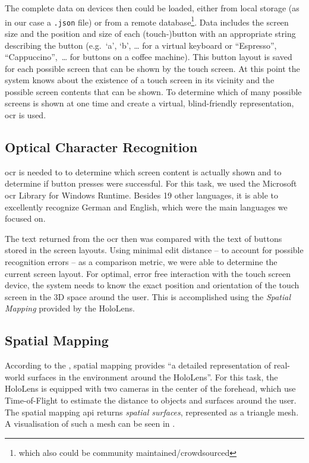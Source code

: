 The complete data on devices then could be loaded, either from local storage (as in  our case a \texttt{.json} file) or from a remote database\footnote{which also could be community maintained/crowdsourced}.
Data includes the screen size and the position and size of each (touch-)button with an appropriate string describing the button (e.g.\ \enquote*{a}, \enquote*{b}, \dots{} for a virtual keyboard or \enquote{Espresso}, \enquote{Cappuccino},~\dots{} for buttons on a coffee machine).
This button layout is saved for each possible screen that can be shown by the touch screen.
At this point  the system knows about the existence of a touch screen in its vicinity and the possible screen contents that can be shown.
To determine which of many possible screens is shown at one time and create a virtual, blind-friendly representation, \ac{ocr} is used.

\subsection{Optical Character Recognition}
\label{subsec:ocr}
\ac{ocr} is needed to  to determine which screen content is actually shown and to determine if button presses were successful.
For this task, we used the Microsoft \ac{ocr} Library for Windows Runtime.
Besides 19 other languages, it is able to excellently recognize German and English, which were the main languages we focused on.

The text returned from the \ac{ocr} then was compared with the text of buttons stored in the screen layouts. 
Using minimal edit distance  -- to account for possible recognition errors -- as a comparison metric, we were able to determine the current screen layout.
For optimal, error free interaction with the touch screen device, the system needs to know the exact position and orientation of the touch screen in the 3D space around the user.
This is accomplished using the \emph{Spatial Mapping} provided by the HoloLens.

\subsection{Spatial Mapping}
\label{subsec:spatial}
According to the \textcite{spatialmapping}, spatial mapping provides \enquote{a detailed representation of real-world surfaces in the environment around the HoloLens}.
For this task, the HoloLens is equipped with two cameras in the center of the forehead, which use Time-of-Flight to estimate the distance to objects and surfaces around the user. 
The spatial mapping \ac{api} returns \emph{spatial surfaces}, represented as a triangle mesh.
A visualisation of such a mesh can be seen in .

